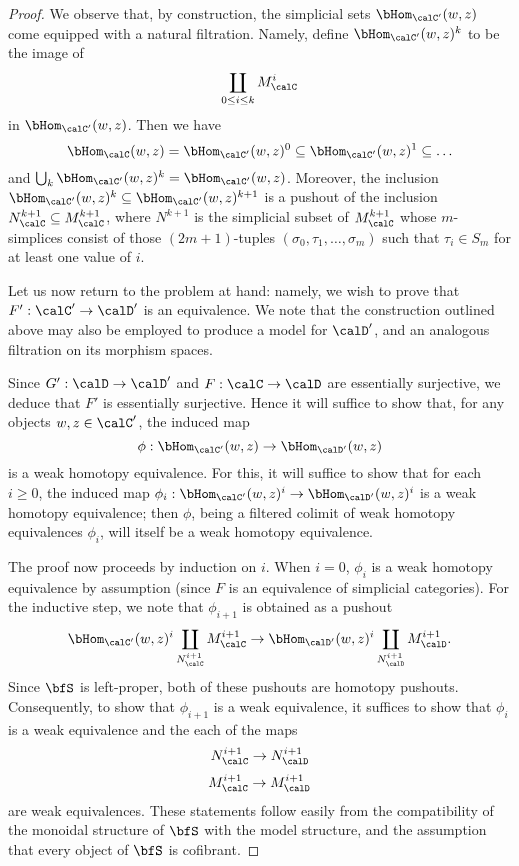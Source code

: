 \begin{Simplicial Categories}
\begin{proof}
We observe that, by construction, the simplicial sets $\bHom_{\calC'}(w,z)$ come equipped with a natural filtration. Namely, define $\bHom_{\calC'}(w,z)^k$ to be the image of
$$ \coprod_{0 \leq i \leq k} M_{\calC}^i $$ in $\bHom_{\calC'}(w,z)$. Then we have
$$ \bHom_{\calC}(w,z) = \bHom_{\calC'}(w,z)^0 \subseteq \bHom_{\calC'}(w,z)^1 \subseteq \ldots$$
and $\bigcup_{k} \bHom_{\calC'}(w,z)^k = \bHom_{\calC'}(w,z)$. Moreover, the inclusion
$ \bHom_{\calC'}(w,z)^k \subseteq \bHom_{\calC'}(w,z)^{k+1}$ is a pushout of the inclusion
$N_{\calC}^{k+1} \subseteq M_{\calC}^{k+1}$, where $N^{k+1}$ is the simplicial subset of $M_{\calC}^{k+1}$ whose
$m$-simplices consist of those $(2m+1)$-tuples $(\sigma_0, \tau_1, \ldots, \sigma_m)$ such that
$\tau_i \in S_m$ for at least one value of $i$.

Let us now return to the problem at hand: namely, we wish to prove that $F': \calC' \rightarrow \calD'$ is an equivalence. We note that the construction outlined above may also be employed to produce a model for $\calD'$, and an analogous filtration on its morphism spaces.

Since $G': \calD \rightarrow \calD'$ and $F: \calC \rightarrow \calD$ are essentially surjective, we deduce that $F'$ is essentially surjective. Hence it will suffice to show that, for any objects $w,z \in \calC'$, the induced map $$\phi: \bHom_{\calC'}(w,z) \rightarrow \bHom_{\calD'}(w,z)$$ is a weak homotopy equivalence.
For this, it will suffice to show that for each $i \geq 0$, the induced map $\phi_i: \bHom_{\calC'}(w,z)^i \rightarrow \bHom_{\calD'}(w,z)^i$ is a weak homotopy equivalence; then $\phi$, being a filtered colimit of weak homotopy equivalences $\phi_i$, will itself be a weak homotopy equivalence.

The proof now proceeds by induction on $i$. When $i=0$, $\phi_i$ is a weak homotopy equivalence by assumption (since $F$ is an equivalence of simplicial categories). For the inductive step, we note that
$\phi_{i+1}$ is obtained as a pushout
$$ \bHom_{\calC'}(w,z)^i \coprod_{ N^{i+1}_{\calC}} M^{i+1}_{\calC} \rightarrow \bHom_{\calD'}(w,z)^i \coprod_{ N^{i+1}_{\calD} } M^{i+1}_{\calD}.$$
Since $\bfS$ is left-proper, both of these pushouts are homotopy pushouts. Consequently, to show that $\phi_{i+1}$ is a weak equivalence, it suffices to show that $\phi_i$ is a weak equivalence and the each of the maps
$$ N^{i+1}_{\calC} \rightarrow N^{i+1}_{\calD}$$
$$ M^{i+1}_{\calC} \rightarrow M^{i+1}_{\calD}$$
are weak equivalences. These statements follow easily from the compatibility of the monoidal
structure of $\bfS$ with the model structure, and the assumption that every object of $\bfS$ is cofibrant.
\end{proof}


\end{Simplicial Categories}
